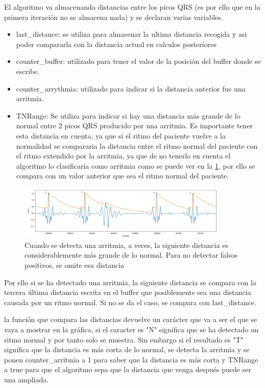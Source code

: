 El algoritmo va almacenando distancias entre los picos QRS (es por ello que en la primera iteración no se almacena nada)
y se declaran varias variables.

\begin{itemize}
    \item last\_distance: se utiliza para almacenar la ultima distancia recogida y asi poder compararla con la distancia 
    actual en calculos posteriores
    \item counter\_buffer: utilizado para tener el valor de la posición del buffer donde se escribe.
    \item counter\_arrythmia: utilizado para indicar si la distancia anterior fue una arritmia.
    \item TNRange: Se utiliza para indicar si hay una distancia más grande de lo normal entre 2 picos QRS producido
    por una arritmia. Es importante tener esta distancia en cuenta, ya que si el ritmo del paciente vuelve a la
    normalidad se compararia la distancia entre el ritmo normal del paciente con el ritmo extendido por la arritmia,
    ya que de no tenerlo en cuenta el algoritmo lo clasificaria como arritmia como se puede ver en la \cref{fig:senial_explicacion_TNRANGE}, por ello se compara con un valor anterior
    que sea el ritmo normal del paciente.
\end{itemize}

\begin{figure}[h!]
    \centering
    \includegraphics[width=0.9\textwidth]{./Images/img_algoritmo/senial_explicacion_TNRANGE.png}
    \caption{Cuando se detecta una arritmia, a veces, la siguiente distancia es considerablemente más grande de lo normal. Para no detectar falsos positivos, se omite esa distancia}
    \label{fig:senial_explicacion_TNRANGE}
\end{figure}

Por ello si se ha detectado una arritmia, la siguiente distancia se compara con
la tercera última distancia escrita en el buffer que posiblemente sea una distancia causada por un ritmo normal. 
Si no se da el caso, se compara con last\_distance.

la función que compara las distancias devuelve un carácter que va a ser el que se vaya a mostrar en la gráfica, 
si el caracter es "N" significa que se ha detectado un ritmo normal y por tanto solo se muestra. Sin embargo si el 
resultado es "T" significa que la distancia es más corta de lo normal, se detecta la arritmia y se ponen
counter\_arritmia a 1 para saber que la distancia es más corta y TNRange a true para que el algoritmo sepa 
que la distancia que venga después puede ser una ampliada. 

